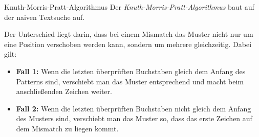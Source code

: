 \begin{algo}{Knuth-Morris-Pratt-Algorithmus}
    Der \emph{Knuth-Morris-Pratt-Algorithmus} baut auf der naiven Textsuche auf.

    Der Unterschied liegt darin, dass bei einem Mismatch das Muster nicht nur um eine Position verschoben werden kann, sondern um mehrere gleichzeitig.
    Dabei gilt:
    \begin{itemize}
        \item \textbf{Fall 1:} Wenn die letzten überprüften Buchstaben gleich dem Anfang des Patterns sind, verschiebt man das Muster entsprechend und macht beim anschließenden Zeichen weiter.
        \item \textbf{Fall 2:} Wenn die letzten überprüften Buchstaben nicht gleich dem Anfang des Musters sind, verschiebt man das Muster so, dass das erste Zeichen auf dem Mismatch zu liegen kommt.
    \end{itemize}
\end{algo}

